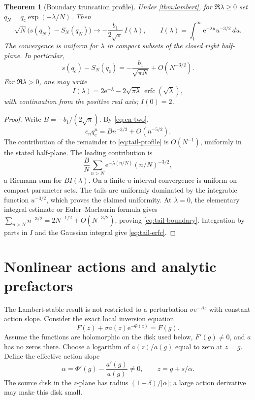 \documentclass[11pt,a4paper]{article}
\numberwithin{equation}{section}
\newtheorem{theorem}{Theorem}[section]
\theoremstyle{definition}
\theoremstyle{remark}
\newcommand{\e}{\mathrm e}
\newcommand{\qcv}{q_{\mathrm c}}
\begin{document}
\begin{theorem}[Boundary truncation profile]
\label{thm:tail}
Under \cref{thm:lambert}, for $\Re\lambda\geq0$ set
$q_N=\qcv\exp(-\lambda/N)$. Then
\begin{equation}
 \sqrt N\bigl(s(q_N)-S_N(q_N)\bigr)
 \longrightarrow
 -\frac{b_1}{2\sqrt\pi}\,I(\lambda),
 \qquad
 I(\lambda)=\int_1^\infty \e^{-\lambda u}u^{-3/2}\,du.
 \label{eq:tail-profile}
\end{equation}
The convergence is uniform for $\lambda$ in compact subsets of the closed right half-plane. In particular,
\begin{equation}
 s(\qcv)-S_N(\qcv)
 =-\frac{b_1}{\sqrt{\pi N}}+O(N^{-3/2}).
 \label{eq:tail-boundary}
\end{equation}
For $\Re\lambda>0$, one may write
\begin{equation}
 I(\lambda)=2\e^{-\lambda}
      -2\sqrt{\pi\lambda}\,\operatorname{erfc}(\sqrt\lambda),
 \label{eq:tail-erfc}
\end{equation}
with continuation from the positive real axis; $I(0)=2$.
\end{theorem}
\begin{proof}
Write $B=-b_1/(2\sqrt\pi)$. By \eqref{eq:cn-two},
\[
 c_n\qcv^n=B n^{-3/2}+O(n^{-5/2}).
\]
The contribution of the remainder to \eqref{eq:tail-profile} is $O(N^{-1})$, uniformly in the stated half-plane. The leading contribution is
\[
 \frac BN\sum_{n>N}\e^{-\lambda(n/N)}(n/N)^{-3/2},
\]
a Riemann sum for $BI(\lambda)$. On a finite $u$-interval convergence is uniform on compact parameter sets. The tails are uniformly dominated by the integrable function $u^{-3/2}$, which proves the claimed uniformity. At $\lambda=0$, the elementary integral estimate or Euler--Maclaurin formula gives
$\sum_{n>N}n^{-3/2}=2N^{-1/2}+O(N^{-3/2})$, proving \eqref{eq:tail-boundary}. Integration by parts in $I$ and the Gaussian integral give \eqref{eq:tail-erfc}.
\end{proof}

\section{Nonlinear actions and analytic prefactors}
\label{sec:actions}
The Lambert-stable result is not restricted to a perturbation $\sigma\e^{-Az}$ with constant action slope. Consider the exact local inversion equation
\begin{equation}
 F(z)+\sigma a(z)\e^{-\Phi(z)}=F(g).
 \label{eq:generalaction}
\end{equation}
Assume the functions are holomorphic on the disk used below, $F'(g)\neq0$, and $a$ has no zeros there. Choose a logarithm of $a(z)/a(g)$ equal to zero at $z=g$. Define the effective action slope
\begin{equation}
 \alpha=\Phi'(g)-\frac{a'(g)}{a(g)}\neq0,
 \qquad z=g+s/\alpha.
 \label{eq:effective-slope}
\end{equation}
The source disk in the $z$-plane has radius $(1+\delta)/|\alpha|$; a large action derivative may make this disk small.
\end{document}
